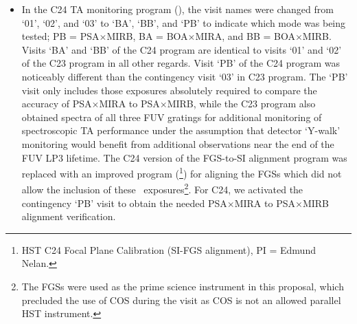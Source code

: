 \begin{itemize}
{Some exposures were slightly lengthened to take advantage of the increased efficiency of the modified OSM2 home position.\footnote{The OSM2 home position was changed from G185M to MIRA on July 6, 2015 (2015.157).}
The contingency visit (`03') was not executed in C23.
}
\item{
In the C24 TA monitoring program (), the visit names were changed from
`01', `02', and `03' to `BA', `BB', and `PB' to indicate which 
mode was being tested; PB = PSA$\times$MIRB, BA = BOA$\times$MIRA, and BB = BOA$\times$MIRB.
Visits `BA' and `BB' of the C24 program are identical to visits `01' and `02' of the C23 program in all other regards.
Visit `PB' of the C24 program was noticeably different than the contingency visit `03' in C23 program.
The `PB' visit only includes those exposures absolutely required to compare the  accuracy of PSA$\times$MIRA to PSA$\times$MIRB, while the C23 program also obtained spectra of all three FUV gratings for additional monitoring of spectroscopic TA performance under the assumption that detector `Y-walk' monitoring would benefit from additional observations near the end of the FUV LP3 lifetime.
The C24 version of the FGS-to-SI alignment program was replaced with an improved program (\footnote{HST C24 Focal Plane Calibration (SI-FGS alignment), PI = Edmund Nelan.}) for aligning the FGSs which did not allow the inclusion of these ~exposures\footnote{The FGSs were used as the prime science instrument in this proposal, which precluded the use of COS during the visit as COS is not an allowed parallel HST instrument.}.
For C24, we activated the contingency `PB' visit to obtain the needed PSA$\times$MIRA to PSA$\times$MIRB  alignment verification.
}
\end{itemize}
